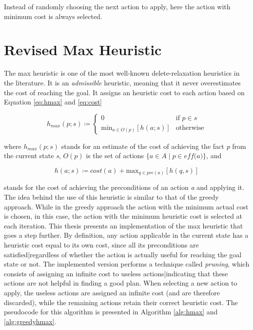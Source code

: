 Instead of randomly choosing the next action to apply, here the action with minimum cost is always selected.

\section{Revised Max Heuristic}
\label{sec:hmax}
The max heuristic is one of the most well-known delete-relaxation heuristics in the literature.
It is an \textit{admissible} heuristic, meaning that it never overestimates the cost of reaching the goal.
It assigns an heuristic cost to each action based on Equation \ref{eq:hmax} and \ref{eq:cost}

\begin{equation}
	\label{eq:hmax}
	h_{max}\left(p;s\right) \coloneqq \begin{cases}
		0                                                                & \text{if $p \in s$} \\
		\text{min}_{a \in O\left(p\right)}\left[h\left(a;s\right)\right] & \text{otherwise}
	\end{cases}
\end{equation}

where $h_{max}\left(p;s\right)$ stands for an estimate of the cost of achieving the fact \textit{p} from
the current state \textit{s}, $O\left(p\right)$ is the set of actions $\{a \in A \mid p \in \textit{eff(a)}\}$, and

\begin{equation}
	\label{eq:cost}
	h\left(a;s\right) \coloneqq cost(a) + \text{max}_{q \in pre\left(a\right)} \left[h(q, s)\right]
\end{equation}

stands for the cost of achieving the preconditions of an action \textit{a} and applying it.\\
The idea behind the use of this heuristic is similar to that of the greedy approach.
While in the greedy approach the action with the minimum actual cost is chosen, in this case,
the action with the minimum heuristic cost is selected at each iteration.
This thesis presents an implementation of the max heuristic that goes a step further.
By definition, any action applicable in the current state has a heuristic cost equal to
its own cost, since all its preconditions are satisfied|regardless of whether the action is
actually useful for reaching the goal state or not.
The implemented version performs a technique called \textit{pruning}, which consists of assigning
an infinite cost to useless actions|indicating that these actions are not helpful in finding a good plan.
When selecting a new action to apply, the useless actions are assigned an infinite cost (and are therefore discarded),
while the remaining actions retain their correct heuristic cost.
The pseudocode for this algorithm is presented in Algorithm \ref{alg:hmax} and \ref{alg:greedyhmax}.

